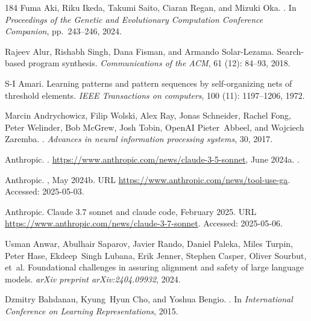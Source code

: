 \begin{thebibliography}{184}
Fuma Aki, Riku Ikeda, Takumi Saito, Ciaran Regan, and Mizuki Oka.
.
\newblock In \emph{Proceedings of the Genetic and Evolutionary Computation
  Conference Companion}, pp.\  243--246, 2024.

Rajeev Alur, Rishabh Singh, Dana Fisman, and Armando Solar-Lezama.
\newblock Search-based program synthesis.
\newblock \emph{Communications of the ACM}, 61 (12): 84--93,
  2018.

S-I Amari.
\newblock Learning patterns and pattern sequences by self-organizing nets of
  threshold elements.
\newblock \emph{IEEE Transactions on computers}, 100 (11):
  1197--1206, 1972.

Marcin Andrychowicz, Filip Wolski, Alex Ray, Jonas Schneider, Rachel Fong,
  Peter Welinder, Bob McGrew, Josh Tobin, OpenAI Pieter~Abbeel, and Wojciech
  Zaremba.
.
\newblock \emph{Advances in neural information processing systems}, 30, 2017.

{Anthropic}.
.
\newblock \url{https://www.anthropic.com/news/claude-3-5-sonnet}, June
  2024{a}.
.

{Anthropic}.
, May 2024{b}.
\newblock URL \url{https://www.anthropic.com/news/tool-use-ga}.
\newblock Accessed: 2025-05-03.

{Anthropic}.
\newblock Claude 3.7 sonnet and claude code, February 2025.
\newblock URL \url{https://www.anthropic.com/news/claude-3-7-sonnet}.
\newblock Accessed: 2025-05-06.

Usman Anwar, Abulhair Saparov, Javier Rando, Daniel Paleka, Miles Turpin, Peter
  Hase, Ekdeep~Singh Lubana, Erik Jenner, Stephen Casper, Oliver Sourbut,
  et~al.
\newblock Foundational challenges in assuring alignment and safety of large
  language models.
\newblock \emph{arXiv preprint arXiv:2404.09932}, 2024.

Dzmitry Bahdanau, Kyung~Hyun Cho, and Yoshua Bengio.
.
\newblock In \emph{International Conference on Learning Representations}, 2015.


\end{thebibliography}
